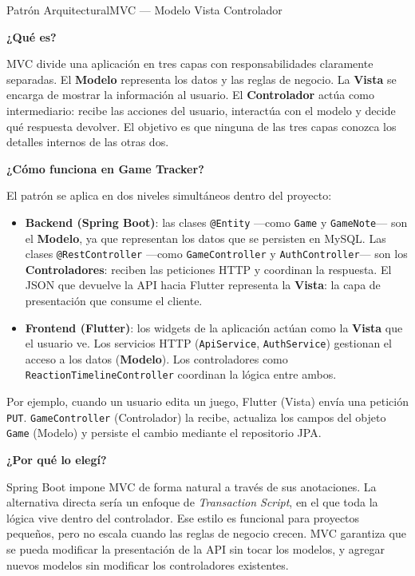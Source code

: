 \begin{patternbox}{Patrón Arquitectural}{MVC — Modelo Vista Controlador}

\textbf{¿Qué es?}

MVC divide una aplicación en tres capas con responsabilidades claramente
separadas. El \textbf{Modelo} representa los datos y las reglas de negocio.
La \textbf{Vista} se encarga de mostrar la información al usuario. El
\textbf{Controlador} actúa como intermediario: recibe las acciones del usuario,
interactúa con el modelo y decide qué respuesta devolver. El objetivo es que
ninguna de las tres capas conozca los detalles internos de las otras dos.

\vspace{0.5em}
\textbf{¿Cómo funciona en Game Tracker?}

El patrón se aplica en dos niveles simultáneos dentro del proyecto:

\begin{itemize}
    \item \textbf{Backend (Spring Boot)}: las clases \texttt{@Entity}
    —como \texttt{Game} y \texttt{GameNote}— son el \textbf{Modelo}, ya que
    representan los datos que se persisten en MySQL. Las clases
    \texttt{@RestController} —como \texttt{GameController} y
    \texttt{AuthController}— son los \textbf{Controladores}: reciben las
    peticiones HTTP y coordinan la respuesta. El JSON que devuelve la API
    hacia Flutter representa la \textbf{Vista}: la capa de presentación que
    consume el cliente.

    \item \textbf{Frontend (Flutter)}: los widgets de la aplicación actúan
    como la \textbf{Vista} que el usuario ve. Los servicios HTTP
    (\texttt{ApiService}, \texttt{AuthService}) gestionan el acceso a los
    datos (\textbf{Modelo}). Los controladores como
    \texttt{ReactionTimelineController} coordinan la lógica entre ambos.
\end{itemize}

Por ejemplo, cuando un usuario edita un juego, Flutter (Vista) envía una
petición \texttt{PUT}. \texttt{GameController} (Controlador) la recibe,
actualiza los campos del objeto \texttt{Game} (Modelo) y persiste el cambio
mediante el repositorio JPA.

\vspace{0.5em}
\textbf{¿Por qué lo elegí?}

Spring Boot impone MVC de forma natural a través de sus anotaciones. La
alternativa directa sería un enfoque de \textit{Transaction Script}, en el que
toda la lógica vive dentro del controlador. Ese estilo es funcional para
proyectos pequeños, pero no escala cuando las reglas de negocio crecen. MVC
garantiza que se pueda modificar la presentación de la API sin tocar los
modelos, y agregar nuevos modelos sin modificar los controladores existentes.

\end{patternbox}


